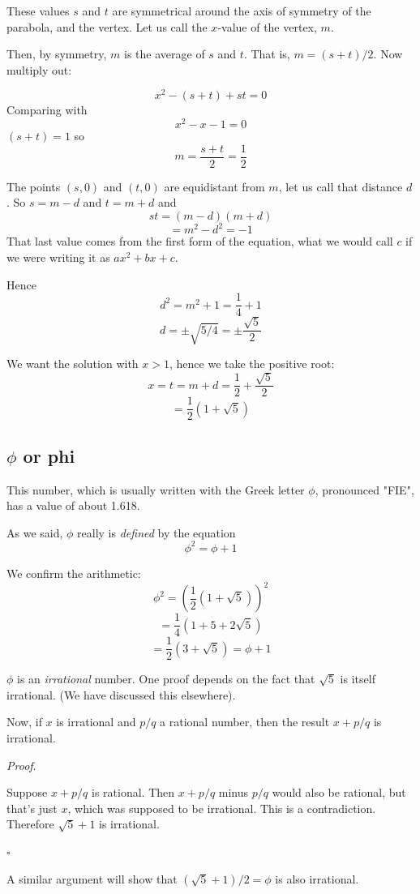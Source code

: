 \documentclass[11pt, oneside]{article}
\begin{document}
These values $s$ and $t$ are symmetrical around the axis of symmetry of the parabola, and the vertex.  Let us call the $x$-value of the vertex, $m$.  

Then, by symmetry, $m$ is the average of $s$ and $t$.  That is, $m = (s + t)/2$.  Now multiply out:

\[ x^2 - (s + t) + st = 0 \]
Comparing with
\[ x^2 - x - 1 = 0 \]
$(s + t) = 1$ so
\[ m = \frac{s + t}{2} = \frac{1}{2} \]

The points $(s,0)$ and $(t,0)$ are equidistant from $m$, let us call that distance $d$.  So $s = m - d$ and $t = m + d$ and 
\[ st = (m - d)(m + d) \]
\[ = m^2 - d^2 = -1 \]
That last value comes from the first form of the equation, what we would call $c$ if we were writing it as $ax^2 + bx + c$.

Hence 
\[ d^2 = m^2 + 1 = \frac{1}{4} + 1 \]
\[ d = \pm \sqrt{5/4} = \pm \frac{\sqrt{5}}{2} \]

We want the solution with $x > 1$, hence we take the positive root:
\[ x = t = m + d = \frac{1}{2} + \frac{\sqrt{5}}{2} \]
\[ = \frac{1}{2} (1 + \sqrt{5}) \]

\subsection*{$\phi$ or phi}

This number, which is usually written with the Greek letter $\phi$, pronounced "FIE", has a value of about 1.618.

As we said, $\phi$ really is \emph{defined} by the equation
\[ \phi^2 = \phi + 1 \]

We confirm the arithmetic:
\[ \phi^2 = (\frac{1}{2} (1 + \sqrt{5}))^2 \]
\[ = \frac{1}{4} (1 + 5 + 2 \sqrt{5}) \]
\[ =  \frac{1}{2} (3 + \sqrt{5}) = \phi + 1 \] 

$\phi$ is an \emph{irrational} number.  One proof depends on the fact that $\sqrt{5}$ is itself irrational.  (We have discussed this elsewhere).

Now, if $x$ is irrational and $p/q$ a rational number, then the result $x + p/q$ is irrational.  

\emph{Proof}.  

Suppose $x + p/q$ is rational.  Then $x + p/q$ minus $p/q$ would also be rational, but that's just $x$, which was supposed to be irrational.  This is a contradiction.  Therefore $\sqrt{5} + 1$ is irrational.  

$\square$

A similar argument will show that $(\sqrt{5} + 1)/2 = \phi$ is also irrational. 
\end{document}
